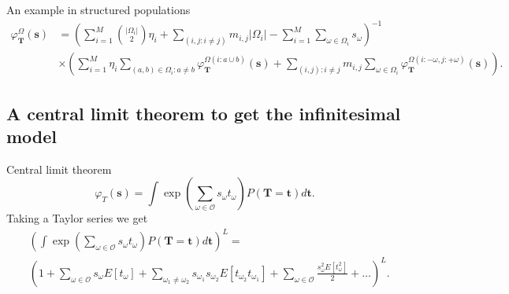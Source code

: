 \documentclass{beamer}
\begin{document}
\begin{frame}{An example in structured populations}
  \begin{align}
    \varphi_{\mathbf{T}}^{\Omega}(\mathbf{s}) &=
                                                \left( \sum_{i=1}^M \binom{|\Omega_i|}{2}\eta_i  + \sum_{(i,j:i \neq j)} m_{i,j}|\Omega_i| -
                                                \sum_{i=1}^M \sum_{\omega \in \Omega_i}s_{\omega}\right)^{-1} \nonumber \\
                                              &\times \left( \sum_{i=1}^M \eta_i \sum_{(a,b) \in \Omega_i:a \neq b}
                                                \varphi_{\mathbf{T}}^{\Omega(i:a \cup b)}(\mathbf{s}) + 
                                                \sum_{(i,j):i\neq j}m_{i,j}\sum_{\omega \in \Omega_i} \varphi_{\mathbf{T}}^{\Omega\left( i :-\omega, j: + \omega \right)}(\mathbf{s})\right). \nonumber
  \end{align}
\end{frame}

\subsection{A central limit theorem to get the infinitesimal model}

\begin{frame}{Central limit theorem}
  \begin{equation*}
    \varphi_T(\mathbf{s}) = \int \exp \left( \sum_{\omega \in \mathcal{O}} s_{\omega}t_{\omega} \right)
    P(\mathbf{T}=\mathbf{t})d\mathbf{t}. \nonumber
  \end{equation*}
  Taking a Taylor series we get
  \scriptsize
  \begin{align}
    \label{eq:mgf_L}
    &\left(\int \exp \left( \sum_{\omega \in \mathcal{O}} s_{\omega}t_{\omega}
      \right)P(\mathbf{T}=\mathbf{t})d\mathbf{t}\right)^L = \nonumber \\  &\left(1 + \sum_{\omega \in \mathcal{O}}
      s_{\omega}E[t_{\omega}] + \sum_{\omega_1 \neq \omega_2}
      s_{\omega_1}s_{\omega_2}E[t_{\omega_2}t_{\omega_1}] + \sum_{\omega \in
        \mathcal{O}} \frac{s_{\omega}^2E[t_{\omega}^2]}{2} + \ldots\right)^L. \nonumber
  \end{align}
  \normalsize
\end{frame}
\end{document}
